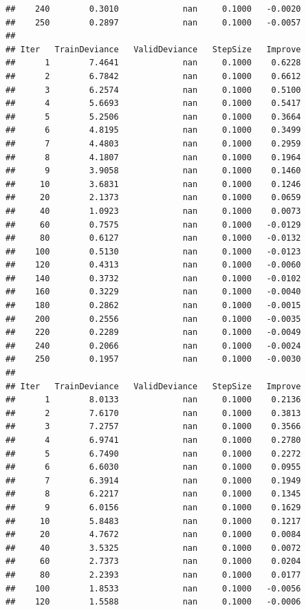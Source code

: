 \documentclass[
]{book}
\begin{document}
\begin{verbatim}
##    240        0.3010             nan     0.1000   -0.0020
##    250        0.2897             nan     0.1000   -0.0057
## 
## Iter   TrainDeviance   ValidDeviance   StepSize   Improve
##      1        7.4641             nan     0.1000    0.6228
##      2        6.7842             nan     0.1000    0.6612
##      3        6.2574             nan     0.1000    0.5100
##      4        5.6693             nan     0.1000    0.5417
##      5        5.2506             nan     0.1000    0.3664
##      6        4.8195             nan     0.1000    0.3499
##      7        4.4803             nan     0.1000    0.2959
##      8        4.1807             nan     0.1000    0.1964
##      9        3.9058             nan     0.1000    0.1460
##     10        3.6831             nan     0.1000    0.1246
##     20        2.1373             nan     0.1000    0.0659
##     40        1.0923             nan     0.1000    0.0073
##     60        0.7575             nan     0.1000   -0.0129
##     80        0.6127             nan     0.1000   -0.0132
##    100        0.5130             nan     0.1000   -0.0123
##    120        0.4313             nan     0.1000   -0.0060
##    140        0.3732             nan     0.1000   -0.0102
##    160        0.3229             nan     0.1000   -0.0040
##    180        0.2862             nan     0.1000   -0.0015
##    200        0.2556             nan     0.1000   -0.0035
##    220        0.2289             nan     0.1000   -0.0049
##    240        0.2066             nan     0.1000   -0.0024
##    250        0.1957             nan     0.1000   -0.0030
## 
## Iter   TrainDeviance   ValidDeviance   StepSize   Improve
##      1        8.0133             nan     0.1000    0.2136
##      2        7.6170             nan     0.1000    0.3813
##      3        7.2757             nan     0.1000    0.3566
##      4        6.9741             nan     0.1000    0.2780
##      5        6.7490             nan     0.1000    0.2272
##      6        6.6030             nan     0.1000    0.0955
##      7        6.3914             nan     0.1000    0.1949
##      8        6.2217             nan     0.1000    0.1345
##      9        6.0156             nan     0.1000    0.1629
##     10        5.8483             nan     0.1000    0.1217
##     20        4.7672             nan     0.1000    0.0084
##     40        3.5325             nan     0.1000    0.0072
##     60        2.7373             nan     0.1000    0.0204
##     80        2.2393             nan     0.1000    0.0177
##    100        1.8533             nan     0.1000   -0.0056
##    120        1.5588             nan     0.1000   -0.0006

\end{verbatim}
\end{document}
